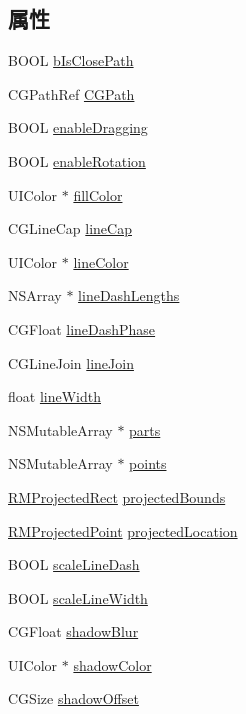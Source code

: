 \subsection*{属性}
\begin{DoxyCompactItemize}
\item 
B\-O\-O\-L \hyperlink{interface_r_m_path_a5e0cdd3cfdf9f079c87555b21e3a8c6e}{b\-Is\-Close\-Path}
\item 
C\-G\-Path\-Ref \hyperlink{interface_r_m_path_af8606a78ec0d3c5994f95b6e5b5b1fd4}{C\-G\-Path}
\item 
B\-O\-O\-L \hyperlink{interface_r_m_path_a6a67c253aa7d8b01eb220c8bcfd9e82f}{enable\-Dragging}
\item 
B\-O\-O\-L \hyperlink{interface_r_m_path_a2ee8138aeba736c62e3025c1d4d6cfde}{enable\-Rotation}
\item 
U\-I\-Color $\ast$ \hyperlink{interface_r_m_path_a24c78845b1cad7d0a707719958a6999e}{fill\-Color}
\item 
C\-G\-Line\-Cap \hyperlink{interface_r_m_path_af0b6eebd8bc03615b3ac8981d05eabef}{line\-Cap}
\item 
U\-I\-Color $\ast$ \hyperlink{interface_r_m_path_ae8b3e91ec89a67481bead38e350e57d7}{line\-Color}
\item 
N\-S\-Array $\ast$ \hyperlink{interface_r_m_path_ae3cb38856ea7fadfab64a740056404ea}{line\-Dash\-Lengths}
\item 
C\-G\-Float \hyperlink{interface_r_m_path_a0280407af3e1d6d0b665af9d2d40ee2d}{line\-Dash\-Phase}
\item 
C\-G\-Line\-Join \hyperlink{interface_r_m_path_a0418ed1c257890ec76454022b32a1077}{line\-Join}
\item 
float \hyperlink{interface_r_m_path_afe3c2bce6675d281fc86f60923b7b8e5}{line\-Width}
\item 
N\-S\-Mutable\-Array $\ast$ \hyperlink{interface_r_m_path_a1e478ab9621bef7d287b13accde96514}{parts}
\item 
N\-S\-Mutable\-Array $\ast$ \hyperlink{interface_r_m_path_a376fb33189a4b9f1f6694825fc7d77d4}{points}
\item 
\hyperlink{struct_r_m_projected_rect}{R\-M\-Projected\-Rect} \hyperlink{interface_r_m_path_ab57ac16906ba51dfc400d02f6a6cce0d}{projected\-Bounds}
\item 
\hyperlink{struct_r_m_projected_point}{R\-M\-Projected\-Point} \hyperlink{interface_r_m_path_a696f7378ed70695bdbc0257105e48eda}{projected\-Location}
\item 
B\-O\-O\-L \hyperlink{interface_r_m_path_afccc6b38950cc3acd53faf1deca80a20}{scale\-Line\-Dash}
\item 
B\-O\-O\-L \hyperlink{interface_r_m_path_a5736a6c5b238f1b928bdfd0659bc9093}{scale\-Line\-Width}
\item 
C\-G\-Float \hyperlink{interface_r_m_path_ac6266f68f5c8dc01aa913e5a74f8ac11}{shadow\-Blur}
\item 
U\-I\-Color $\ast$ \hyperlink{interface_r_m_path_a2478b26b83164f11d71b5c716c733c34}{shadow\-Color}
\item 
C\-G\-Size \hyperlink{interface_r_m_path_ad0a770fb5c74fc7bb09b2d15a642fac5}{shadow\-Offset}
\end{DoxyCompactItemize}



